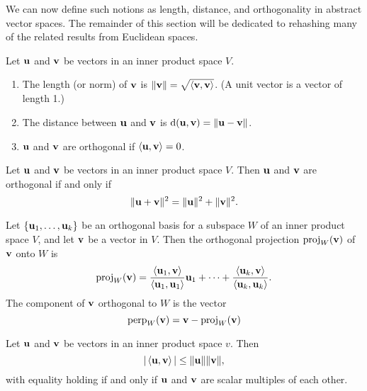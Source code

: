 \documentclass[../m073main.tex]{subfiles}
\begin{document}
We can now define such notions as length, distance, and orthogonality in abstract vector spaces.
The remainder of this section will be dedicated to rehashing many of the related results from Euclidean spaces.

\begin{definition}
	Let $\mathbf{u}$ and $\mathbf{v}$ be vectors in an inner product space $V$.
	\begin{enumerate}
		\item The length (or norm) of $\mathbf{v}$ is $\|\mathbf{v}\| = \sqrt{\left< \mathbf{v}, \mathbf{v} \right>}$.
		(A unit vector is a vector of length 1.)
		\item The distance between $\mathbf{u}$ and $\mathbf{v}$ is $\textrm{d}(\mathbf{u}, \mathbf{v}) = \|\mathbf{u} - \mathbf{v}\|$.
		\item $\mathbf{u}$ and $\mathbf{v}$ are orthogonal if $\left< \mathbf{u}, \mathbf{v} \right> = 0$.
	\end{enumerate}
\end{definition}

\begin{theorem}
	Let $\mathbf{u}$ and $\mathbf{v}$ be vectors in an inner product space $V$.
	Then $\mathbf{u}$ and $\mathbf{v}$ are orthogonal if and only if
	\[ \|\mathbf{u} + \mathbf{v}\|^2 = \|\mathbf{u}\|^2 + \|\mathbf{v}\|^2. \]
\end{theorem}

\begin{definition}
	Let $\{\mathbf{u}_1, \ldots, \mathbf{u}_k\}$ be an orthogonal basis for a subspace $W$ of an inner product space $V$, and let $\mathbf{v}$ be a vector in $V$.
	Then the orthogonal projection $\textrm{proj}_W(\mathbf{v})$ of $\mathbf{v}$ onto $W$ is
	\[ \textrm{proj}_W(\mathbf{v}) = \frac{\left< \mathbf{u}_1, \mathbf{v} \right>}{\left< \mathbf{u}_1, \mathbf{u}_1 \right>} \mathbf{u}_1 + \cdots + \frac{\left< \mathbf{u}_k, \mathbf{v} \right>}{\left< \mathbf{u}_k, \mathbf{u}_k \right>}. \]
	The component of $\mathbf{v}$ orthogonal to $W$ is the vector
	\[ \textrm{perp}_W(\mathbf{v}) = \mathbf{v} - \textrm{proj}_W(\mathbf{v}) \]
\end{definition}

\begin{theorem}
	Let $\mathbf{u}$ and $\mathbf{v}$ be vectors in an inner product space $v$.
	Then
	\[ |\left< \mathbf{u}, \mathbf{v} \right>| \leq \|\mathbf{u}\| \|\mathbf{v}\|, \]
	with equality holding if and only if $\mathbf{u}$ and $\mathbf{v}$ are scalar multiples of each other.
\end{theorem}
\end{document}
